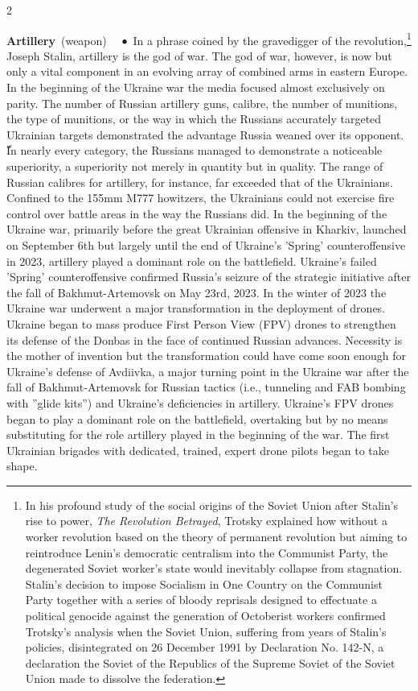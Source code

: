 \documentclass[10pt,a4paper,twoside]{article} %
\newcommand{\entry}[4]{\markboth{#1}{#1}\textbf{#1}\ {(#2)}\ \textit{#3}\ $\bullet$\ {#4}}  %
\begin{document}
\begin{multicols}{2}
\entry{Artillery} {weapon} { } {In a phrase coined by the gravedigger of the revolution,\footnote{In his profound study of the social origins of the Soviet Union after Stalin's rise to power, \emph{The Revolution Betrayed}, Trotsky explained how without a worker revolution based on the theory of permanent revolution but aiming to reintroduce Lenin's democratic centralism into the Communist Party, the degenerated Soviet worker's state would inevitably collapse from stagnation. Stalin's decision to impose Socialism in One Country on the Communist Party together with a series of bloody reprisals designed to effectuate a political genocide against the generation of Octoberist workers confirmed Trotsky's analysis when the Soviet Union, suffering from years of Stalin's policies, disintegrated on 26 December 1991 by Declaration No. 142-N, a declaration the Soviet of the Republics of the Supreme Soviet of the Soviet Union made to dissolve the federation.} Joseph Stalin, artillery is the god of war. The god of war, however, is now but only a vital component in an evolving array of combined arms in eastern Europe. In the beginning of the Ukraine war the  media focused almost exclusively on parity. The number of Russian artillery guns, calibre, the number of munitions, the type of munitions, or the way in which the Russians accurately targeted Ukrainian targets demonstrated the advantage Russia weaned over its opponent. ّIn nearly every category, the Russians managed to demonstrate a noticeable superiority, a superiority not merely in quantity but in quality. The range of Russian calibres for artillery, for instance, far exceeded that of the Ukrainians. Confined to the 155mm M777 howitzers, the Ukrainians could not exercise fire control over battle areas in the way the Russians did. \newline \indent In the beginning of the Ukraine war, primarily before the great Ukrainian offensive in Kharkiv, launched on September 6th but largely until the end of Ukraine's 'Spring' counteroffensive in 2023, artillery played a dominant role on the battlefield. Ukraine's failed 'Spring' counteroffensive confirmed Russia's seizure of the strategic initiative after the fall of Bakhmut-Artemovsk on May 23rd, 2023. In the winter of 2023 the Ukraine war underwent a major transformation in the deployment of drones. Ukraine began to mass produce First Person View (FPV) drones to strengthen its defense of the Donbas in the face of continued Russian advances. Necessity is the mother of invention but the transformation could have come soon enough for Ukraine's defense of Avdiivka, a major turning point in the Ukraine war after the fall of Bakhmut-Artemovsk for Russian tactics (i.e., tunneling and FAB bombing with ”glide kits”) and Ukraine's deficiencies in artillery. Ukraine's FPV drones began to play a dominant role on the battlefield, overtaking but by no means substituting for the role artillery played in the beginning of the war. The first Ukrainian brigades with dedicated, trained, expert drone pilots began to take shape.}


\end{multicols}
\end{document}
